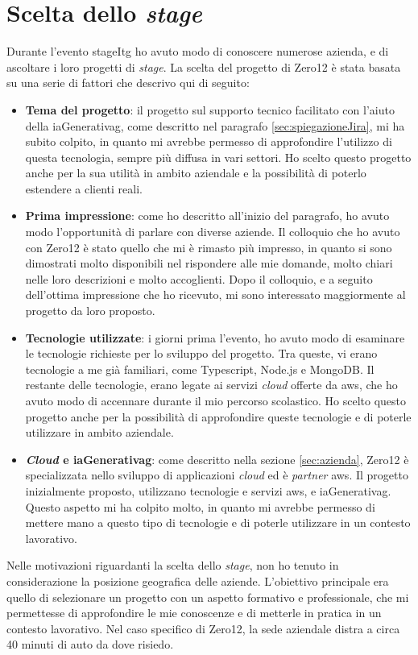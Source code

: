 \section{Scelta dello \textit{stage}} \label{sec:sceltaStage}
Durante l'evento \gls{stageItg} ho avuto modo di conoscere numerose azienda, e di ascoltare i loro progetti di \textit{stage}. 
La scelta del progetto di Zero12 è stata basata su una serie di fattori che descrivo qui di seguito:
\begin{itemize}
    \item \textbf{Tema del progetto}: il progetto sul supporto tecnico facilitato con l'aiuto della \gls{iaGenerativag}, come descritto nel paragrafo \ref{sec:spiegazioneJira}, mi ha subito colpito, in quanto mi avrebbe permesso di approfondire l'utilizzo di questa tecnologia, sempre più diffusa in vari settori. Ho scelto questo progetto anche per la sua utilità in ambito aziendale e la possibilità di poterlo estendere a clienti reali.
    \item \textbf{Prima impressione}: come ho descritto all'inizio del paragrafo, ho avuto modo l'opportunità di parlare con diverse aziende. Il colloquio che ho avuto con Zero12 è stato quello che mi è rimasto più impresso, in quanto si sono dimostrati molto disponibili nel rispondere alle mie domande, molto chiari nelle loro descrizioni e molto accoglienti. Dopo il colloquio, e a seguito dell'ottima impressione che ho ricevuto, mi sono interessato maggiormente al progetto da loro proposto.
    \item \textbf{Tecnologie utilizzate}: i giorni prima l'evento, ho avuto modo di esaminare le tecnologie richieste per lo sviluppo del progetto. Tra queste, vi erano tecnologie a me già familiari, come Typescript, Node.js e MongoDB. Il restante delle tecnologie, erano legate ai servizi \textit{cloud} offerte da \gls{aws}, che ho avuto modo di accennare durante il mio percorso scolastico. Ho scelto questo progetto anche per la possibilità di approfondire queste tecnologie e di poterle utilizzare in ambito aziendale.
    \item \textbf{\textit{Cloud} e \gls{iaGenerativag}}: come descritto nella sezione \ref{sec:azienda}, Zero12 è specializzata nello sviluppo di applicazioni \textit{cloud} ed è \textit{partner} \gls{aws}. Il progetto inizialmente proposto, utilizzano tecnologie e servizi \gls{aws}, e \gls{iaGenerativag}. Questo aspetto mi ha colpito molto, in quanto mi avrebbe permesso di mettere mano a questo tipo di tecnologie e di poterle utilizzare in un contesto lavorativo.
\end{itemize}
Nelle motivazioni riguardanti la scelta dello \textit{stage}, non ho tenuto in considerazione la posizione geografica delle aziende. L'obiettivo principale era quello di selezionare un progetto con un aspetto formativo e professionale, che mi permettesse di approfondire le mie conoscenze e di metterle in pratica in un contesto lavorativo. Nel caso specifico di Zero12, la sede aziendale distra a circa 40 minuti di auto da dove risiedo.
